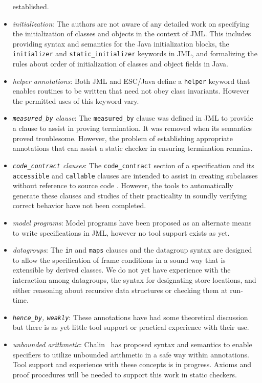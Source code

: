 \documentclass{sig-alternate}
\begin{document}
\begin{itemize}
established.
\item \textit{initialization}:  The authors are not aware of any detailed work on specifying the initialization
of classes and objects in the context of JML.  This includes providing syntax and semantics for the
Java initialization blocks, the \texttt{initializer} and \texttt{static\_initializer} keywords in
JML, and formalizing the rules about order of initialization of classes and object fields in Java.
\item \textit{helper annotations}:  Both JML and ESC/Java define a \texttt{helper} keyword that enables 
routines to be written that need not obey class invariants.  However the permitted uses of this
keyword vary.
\item \textit{\texttt{measured\_by} clause}:  The \texttt{measured\_by} clause was defined in JML to
provide a clause to assist in proving termination.  It was removed when its semantics
proved troublesome.  However, the problem of establishing appropriate annotations that
can assist a static checker in ensuring termination remains.
\item \textit{\texttt{code\_contract} clauses}:  The \texttt{code\_contract} section of a specification and its
\texttt{accessible} and \texttt{callable} clauses are intended to assist in creating subclasses 
without reference to source code \cite{Ruby-Leavens00}.  However, the tools to automatically
generate these clauses and studies of their practicality in soundly verifying correct behavior have
not been completed.
\item \textit{model programs}:  Model programs have been proposed as an alternate means to write
specifications in JML, however no tool support exists as yet.
\item \textit{datagroups}:  The \texttt{in} and \texttt{maps} clauses and the datagroup syntax are designed
to allow the specification of frame conditions in a sound way that is extensible by derived classes. 
We do not yet have experience with the interaction among datagroups, the syntax for designating store locations, and either reasoning about recursive data structures or checking them at 
run-time.
\item \textit{\texttt{hence\_by}, \texttt{weakly}}:  These annotations have had some theoretical discussion but
there is as yet little tool support or practical experience with their use.
\item \textit{unbounded
  arithmetic}:  Chalin~\cite{Chalin03} has proposed syntax and semantics to enable specifiers to utilize unbounded arithmetic in a safe way within annotations.  Tool support and experience with
these concepts is in progress.  Axioms and proof procedures will be needed to support this work
in static checkers.
\end{itemize}
\end{document}
